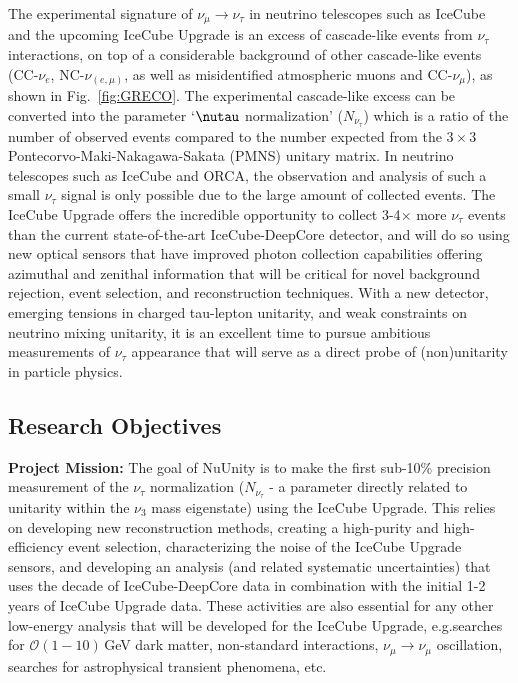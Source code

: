 \documentclass[a4paper,11pt]{article}
\begin{document}
The experimental signature of $\nu_\mu \rightarrow \nu_\tau$ in neutrino telescopes such as IceCube and the upcoming IceCube Upgrade is an excess of cascade-like events from $\nu_\tau$ interactions, on top of a considerable background of other cascade-like events (\mbox{CC-$\nu_e$}, \mbox{NC-$\nu_{(e,\mu)}$}, as well as misidentified atmospheric muons and \mbox{CC-$\nu_\mu$}), as shown in Fig.~\ref{fig:GRECO}. The experimental cascade-like excess can be converted into the parameter `$\nutau$ normalization' ($N_{\nu_\tau}$) which is a ratio of the number of observed events compared to the number expected from the {$3\times3$} Pontecorvo-Maki-Nakagawa-Sakata (PMNS)\cite{Pontecorvo:1957qd, Maki:1962mu} unitary matrix. In neutrino telescopes such as IceCube and ORCA\cite{Eberl:2017plv}, the observation and analysis of such a small $\nu_\tau$ signal is only possible due to the large amount of collected events. The IceCube Upgrade offers the incredible opportunity to collect 3-4$\times$ more $\nu_\tau$ events than the current state-of-the-art IceCube-DeepCore detector, and will do so using new optical sensors that have improved photon collection capabilities offering azimuthal and zenithal information that will be critical for novel background rejection, event selection, and reconstruction techniques. With a new detector, emerging tensions in charged tau-lepton unitarity, and weak constraints on neutrino mixing unitarity, it is an excellent time to pursue ambitious measurements of $\nu_\tau$ appearance that will serve as a direct probe of (non)unitarity in particle physics. 

\subsection{Research Objectives}

\textbf{Project Mission:} The goal of NuUnity is to make the first sub-10\% precision measurement of the $\nu_\tau$ normalization ($N_{\nu_\tau}$ - a parameter directly related to unitarity within the $\nu_3$ mass eigenstate) using the IceCube Upgrade. This relies on developing new reconstruction methods, creating a high-purity and high-efficiency event selection, characterizing the noise of the IceCube Upgrade sensors, and developing an analysis (and related systematic uncertainties) that uses the decade of IceCube-DeepCore data in combination with the initial 1-2 years of IceCube Upgrade data. These activities are also essential for any other low-energy analysis that will be developed for the IceCube Upgrade, e.g.\@ searches for $\mathcal{O}(1-10)$\,GeV dark matter, non-standard interactions, $\nu_\mu \rightarrow \nu_\mu$ oscillation, searches for astrophysical transient phenomena, etc.
\end{document}
